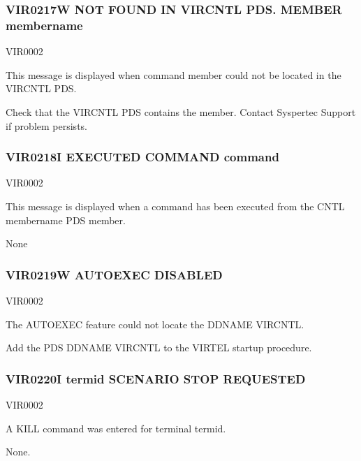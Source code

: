 \documentclass[letterpaper,10pt,english]{sphinxmanual}
\begin{document}
\subsubsection{VIR0217W  NOT FOUND IN VIRCNTL PDS. MEMBER membername}
\label{\detokenize{messages:vir0217w-not-found-in-vircntl-pds-member-membername}}\begin{description}
\sphinxAtStartPar
VIR0002

\sphinxAtStartPar
This message is displayed when command member could not be located in the VIRCNTL PDS.

\sphinxAtStartPar
Check that the VIRCNTL PDS contains the member. Contact Syspertec Support if problem persists.

\end{description}


\subsubsection{VIR0218I  EXECUTED COMMAND command}
\label{\detokenize{messages:vir0218i-executed-command-command}}\begin{description}
\sphinxAtStartPar
VIR0002

\sphinxAtStartPar
This message is displayed when a command has been executed from the CNTL membername PDS member.

\sphinxAtStartPar
None

\end{description}


\subsubsection{VIR0219W  AUTOEXEC DISABLED}
\label{\detokenize{messages:vir0219w-autoexec-disabled}}\begin{description}
\sphinxAtStartPar
VIR0002

\sphinxAtStartPar
The AUTOEXEC feature could not locate the DDNAME VIRCNTL.

\sphinxAtStartPar
Add the PDS DDNAME VIRCNTL to the VIRTEL startup procedure.

\end{description}


\subsubsection{VIR0220I termid SCENARIO STOP REQUESTED}
\label{\detokenize{messages:vir0220i-termid-scenario-stop-requested}}\begin{description}
\sphinxAtStartPar
VIR0002

\sphinxAtStartPar
A KILL command was entered for terminal termid.

\sphinxAtStartPar
None.

\end{description}
\end{document}
